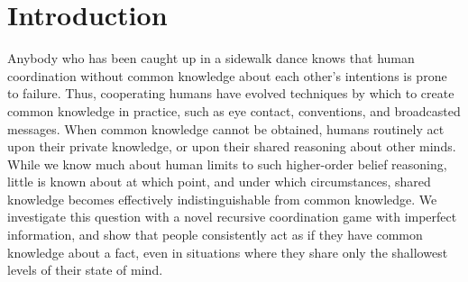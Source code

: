 \documentclass[twocolumn,a4paper,superscriptaddress,nofootinbib]{revtex4}
\newcommand{\tobo}[1]{{\color{red} TOBO: #1}}
\newcommand{\tsn}[1]{{\color{blue} TSN: #1}}
\newcommand{\re}[1]{{\color{brown} RE: #1}}
\begin{document}
\begin{abstract}
%
\end{abstract}


\section{Introduction}
Anybody who has been caught up in a sidewalk dance knows that human coordination without common knowledge about each other's intentions is prone to failure. Thus, cooperating humans have evolved techniques by which to create common knowledge in practice, such as eye contact, conventions, and broadcasted messages. When common knowledge cannot be obtained, humans routinely act upon their private knowledge, or upon their shared reasoning about other minds. While we know much about human limits to such higher-order belief reasoning, little is known about at which point, and under which circumstances, shared knowledge becomes effectively indistinguishable from common knowledge. We investigate this question with a novel recursive coordination game with imperfect information, and show that people consistently act as if they have common knowledge about a fact, even in situations where they share only the shallowest levels of their state of mind. 
\end{document}
